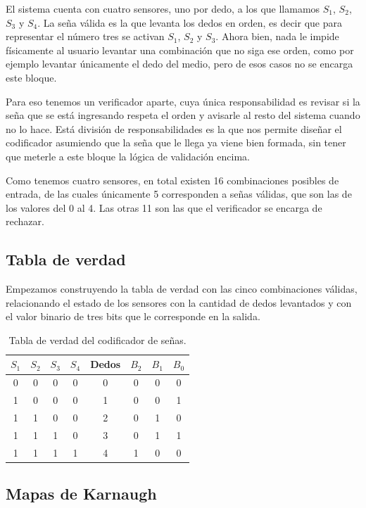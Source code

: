 \documentclass[12pt]{article}
\begin{document}
El sistema cuenta con cuatro sensores, uno por dedo, a los que llamamos $S_1$,
$S_2$, $S_3$ y $S_4$. La seña válida es la que levanta los dedos en orden, es
decir que para representar el número tres se activan $S_1$, $S_2$ y $S_3$. Ahora
bien, nada le impide físicamente al usuario levantar una combinación que no siga
ese orden, como por ejemplo levantar únicamente el dedo del medio, pero de esos
casos no se encarga este bloque.

Para eso tenemos un verificador aparte, cuya única responsabilidad es revisar si
la seña que se está ingresando respeta el orden y avisarle al resto del sistema
cuando no lo hace. Está división de responsabilidades es la que nos permite
diseñar el codificador asumiendo que la seña que le llega ya viene bien formada,
sin tener que meterle a este bloque la lógica de validación encima.

Como tenemos cuatro sensores, en total existen 16 combinaciones posibles de
entrada, de las cuales únicamente 5 corresponden a señas válidas, que son las de
los valores del 0 al 4. Las otras 11 son las que el verificador se encarga de
rechazar.

\subsection{Tabla de verdad}

Empezamos construyendo la tabla de verdad con las cinco combinaciones válidas,
relacionando el estado de los sensores con la cantidad de dedos levantados y con
el valor binario de tres bits que le corresponde en la salida.

\begin{table}[H]
\centering
\begin{tabular}{cccc|c|ccc}
$S_1$ & $S_2$ & $S_3$ & $S_4$ & Dedos & $B_2$ & $B_1$ & $B_0$ \\
\hline
0 & 0 & 0 & 0 & 0 & 0 & 0 & 0 \\
1 & 0 & 0 & 0 & 1 & 0 & 0 & 1 \\
1 & 1 & 0 & 0 & 2 & 0 & 1 & 0 \\
1 & 1 & 1 & 0 & 3 & 0 & 1 & 1 \\
1 & 1 & 1 & 1 & 4 & 1 & 0 & 0 \\
\end{tabular}
\caption{Tabla de verdad del codificador de señas.}
\end{table}

\subsection{Mapas de Karnaugh}
\end{document}
